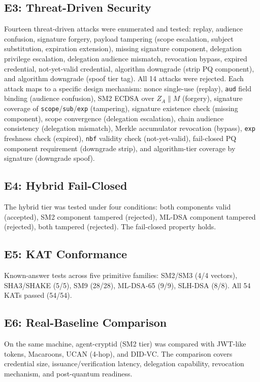 \documentclass[10pt,twocolumn]{IEEEtran}
\begin{document}
\subsection{E3: Threat-Driven Security}

Fourteen threat-driven attacks were enumerated and tested: replay,
audience confusion, signature forgery, payload tampering (scope
escalation, subject substitution, expiration extension), missing
signature component, delegation privilege escalation, delegation audience
mismatch, revocation bypass, expired credential, not-yet-valid credential,
algorithm downgrade (strip PQ component), and algorithm downgrade (spoof
tier tag). All 14 attacks were rejected. Each attack maps to a specific
design mechanism: nonce single-use (replay), \texttt{aud} field binding
(audience confusion), SM2 ECDSA over $Z_A \parallel M$ (forgery), signature
coverage of \texttt{scope}/\texttt{sub}/\texttt{exp} (tampering), signature
existence check (missing component), scope convergence (delegation
escalation), chain audience consistency (delegation mismatch), Merkle
accumulator revocation (bypass), \texttt{exp} freshness check (expired),
\texttt{nbf} validity check (not-yet-valid), fail-closed PQ component
requirement (downgrade strip), and algorithm-tier coverage by signature
(downgrade spoof).

\subsection{E4: Hybrid Fail-Closed}

The hybrid tier was tested under four conditions: both components valid
(accepted), SM2 component tampered (rejected), ML-DSA component tampered
(rejected), both tampered (rejected). The fail-closed property holds.

\subsection{E5: KAT Conformance}

Known-answer tests across five primitive families: SM2/SM3 (4/4 vectors),
SHA3/SHAKE (5/5), SM9 (28/28), ML-DSA-65 (9/9), SLH-DSA (8/8).
All 54 KATs passed (54/54).

\subsection{E6: Real-Baseline Comparison}

On the same machine, agent-cryptid (SM2 tier) was compared with
JWT-like tokens, Macaroons, UCAN (4-hop), and DID-VC. The comparison
covers credential size, issuance/verification latency, delegation
capability, revocation mechanism, and post-quantum readiness.
\end{document}
